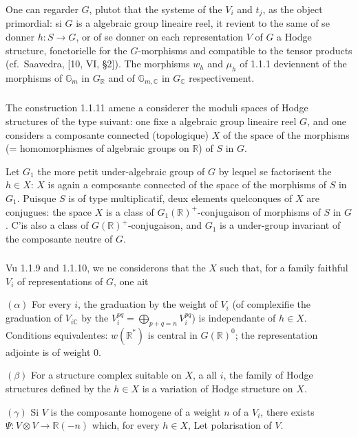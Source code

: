 \documentclass[12pt,a4paper]{article}
\theoremstyle{plain}
\theoremstyle{definition}
\theoremstyle{remark}
\newcommand{\RR}{\mathbb{R}}
\newcommand{\CC}{\mathbb{C}}
\newcommand{\Gm}{\mathbb{G}}
\begin{document}
One can regarder $G$, plutot that the systeme of the $V_i$ and $t_j$, as the object primordial: si $G$ is a algebraic group lineaire reel, it revient to the same of se donner $h:S \to G$, or of se donner on each representation $V$ of $G$ a Hodge structure, fonctorielle for the $G$-morphisms and compatible to the tensor products (cf.~Saavedra, [10, VI, \S2]). The morphisms $w_h$ and $\mu_h$ of 1.1.1 deviennent of the morphisms of $\Gm_m$ in $G_{\RR}$ and of $\Gm_{m,\CC}$ in $G_{\CC}$ respectivement.

\subsubsection{}

The construction 1.1.11 amene a considerer the moduli spaces of Hodge structures of the type suivant: one fixe a algebraic group lineaire reel $G$, and one considers a composante connected (topologique) $X$ of the space of the morphisms (= homomorphismes of algebraic groups on $\RR$) of $S$ in $G$.

Let $G_1$ the more petit under-algebraic group of $G$ by lequel se factorisent the $h \in X$: $X$ is again a composante connected of the space of the morphisms of $S$ in $G_1$. Puisque $S$ is of type multiplicatif, deux elements quelconques of $X$ are conjugues: the space $X$ is a class of $G_1(\RR)^+$-conjugaison of morphisms of $S$ in $G$. C'is also a class of $G(\RR)^+$-conjugaison, and $G_1$ is a under-group invariant of the composante neutre of $G$.

\subsubsection{}

Vu 1.1.9 and 1.1.10, we ne considerons that the $X$ such that, for a family faithful $V_i$ of representations of $G$, one ait

$(\alpha)$ For every $i$, the graduation by the weight of $V_i$ (of complexifie the graduation of $V_{i\CC}$ by the $V_i^{pq} = \bigoplus_{p+q=n} V_i^{pq}$) is independante of $h \in X$. Conditions equivalentes: $w(\RR^*)$ is central in $G(\RR)^0$; the representation adjointe is of weight 0.

$(\beta)$ For a structure complex suitable on $X$, a all $i$, the family of Hodge structures defined by the $h \in X$ is a variation of Hodge structure on $X$.

$(\gamma)$ Si $V$ is the composante homogene of a weight $n$ of a $V_i$, there exists $\Psi:V \otimes V \to \RR(-n)$ which, for every $h \in X$, Let polarisation of $V$.
\end{document}
